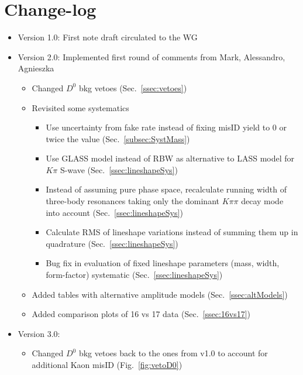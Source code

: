 
\section*{Change-log}
\label{sec:change}

\enlargethispage{2\baselineskip}

\begin{itemize}
	\item Version 1.0: First note draft circulated to the WG
	
	\item Version 2.0: Implemented first round of comments from Mark, Alessandro, Agnieszka
	\begin{itemize}
		\item Changed $D^0$ bkg vetoes (Sec.~\ref{ssec:vetoes}) 
		\item Revisited some systematics
			\begin{itemize}
				\item Use uncertainty from fake rate instead of fixing misID yield to 0 or twice the value (Sec.~\ref{subsec:SystMass})
				\item Use GLASS model instead of RBW as alternative to LASS model for $K\pi$ S-wave (Sec.~\ref{ssec:lineshapeSys}) 
				\item Instead of assuming pure phase space, 
					recalculate running width of three-body resonances taking only the dominant $K\pi\pi$ decay mode into account (Sec.~\ref{ssec:lineshapeSys}) 
				\item Calculate RMS of lineshape variations instead of summing them up in quadrature (Sec.~\ref{ssec:lineshapeSys}) 
				\item Bug fix in evaluation of fixed lineshape parameters (mass, width, form-factor) systematic (Sec.~\ref{ssec:lineshapeSys}) 
			\end{itemize}
		\item Added tables with alternative amplitude models (Sec.~\ref{ssec:altModels}) 
		\item Added comparison plots of 16 vs 17 data (Sec.~\ref{ssec:16vs17}) 
	\end{itemize}
	
	\item Version 3.0: 
	\begin{itemize}
	
		\item Changed $D^0$ bkg vetoes back to the ones from v1.0 to account for additional Kaon misID (Fig.~\ref{fig:vetoD0}) 		


\end{itemize}
\end{itemize}

